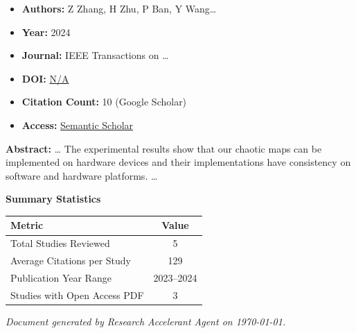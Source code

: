 \documentclass[11pt,a4paper]{article}
\begin{document}
\begin{resultbox}
\begin{itemize}[leftmargin=*]
    \item \textbf{Authors:} Z Zhang, H Zhu, P Ban, Y Wang…
    \item \textbf{Year:} 2024
    \item \textbf{Journal:} IEEE Transactions on …
    
    
    
    \item \textbf{DOI:} \href{https://doi.org/}{N/A}
    \item \textbf{Citation Count:} 10 (Google Scholar)
    \item \textbf{Access:} \href{https://ieeexplore.ieee.org/abstract/document/10627944/}{Semantic Scholar}
\end{itemize}
\end{resultbox}

\textbf{Abstract:} … The experimental results show that our chaotic maps can be implemented on hardware devices and their implementations have consistency on software and hardware platforms. …\par\vspace{0.5em}



\vspace{1em}
\textbf{\large Summary Statistics}\par\vspace{0.5em}

\begin{center}
\begin{tabular}{lc}
\toprule
\textbf{Metric} & \textbf{Value} \\
\midrule
Total Studies Reviewed & 5 \\
Average Citations per Study & 129 \\
Publication Year Range & 2023--2024 \\
Studies with Open Access PDF & 3 \\
\bottomrule
\end{tabular}
\end{center}


\vfill
\begin{center}
\textit{Document generated by Research Accelerant Agent on \today.}
\end{center}
\end{document}
